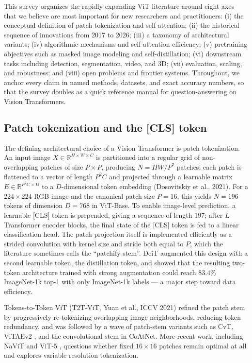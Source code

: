 \documentclass{article}
\begin{document}
This survey organizes the rapidly expanding ViT literature around eight axes that we believe are most important for new researchers and practitioners: (i) the conceptual definition of patch tokenization and self-attention; (ii) the historical sequence of innovations from 2017 to 2026; (iii) a taxonomy of architectural variants; (iv) algorithmic mechanisms and self-attention efficiency; (v) pretraining objectives such as masked image modeling and self-distillation; (vi) downstream tasks including detection, segmentation, video, and 3D; (vii) evaluation, scaling, and robustness; and (viii) open problems and frontier systems. Throughout, we anchor every claim in named methods, datasets, and exact accuracy numbers, so that the survey doubles as a quick reference manual for question-answering on Vision Transformers.

\subsection{Patch tokenization and the {[}CLS{]} token}\label{patch-tokenization-and-the-cls-token}

The defining architectural choice of a Vision Transformer is patch tokenization. An input image \(X \in \mathbb{R}^{H \times W \times C}\) is partitioned into a regular grid of non-overlapping patches of size \(P \times P\), producing \(N = HW/P^2\) patches; each patch is flattened to a vector of length \(P^2 C\) and projected through a learnable matrix \(E \in \mathbb{R}^{P^2 C \times D}\) to a \(D\)-dimensional token embedding (Dosovitskiy et al., 2021). For a \(224 \times 224\) RGB image and the canonical patch size \(P=16\), this yields \(N = 196\) tokens of dimension \(D=768\) in ViT-Base. To enable image-level prediction, a learnable {[}CLS{]} token is prepended, giving a sequence of length 197; after \(L\) Transformer encoder blocks, the final state of the {[}CLS{]} token is fed to a linear classification head. The patch projection itself is implemented efficiently as a strided convolution with kernel size and stride both equal to \(P\), which the literature sometimes calls the ``patchify stem''. DeiT \citep{touvron2022resmlpfeedforwardn} augmented this design with a second learnable token, the distillation token, and showed that the resulting two-token architecture trained with strong augmentation could reach 83.4\% ImageNet-1k top-1 with only ImageNet-1k labels --- a major step toward data efficiency.

Tokens-to-Token ViT (T2T-ViT, Yuan et al., ICCV 2021) refined the patch stem by progressively re-tokenizing overlapping image neighborhoods, reducing token redundancy, and was followed by a wave of patch-stem variants such as CvT, ViTAEv2 \citep{zhang2023vitaev2visiontrans}, and the convolutional stem in CoAtNet. More recent work, including NaViT and ViT-5 \citep{wang2026vit5visiontransfor}, questions whether fixed \(16 \times 16\) patches remain optimal at all and explores variable-resolution tokenization.
\end{document}
